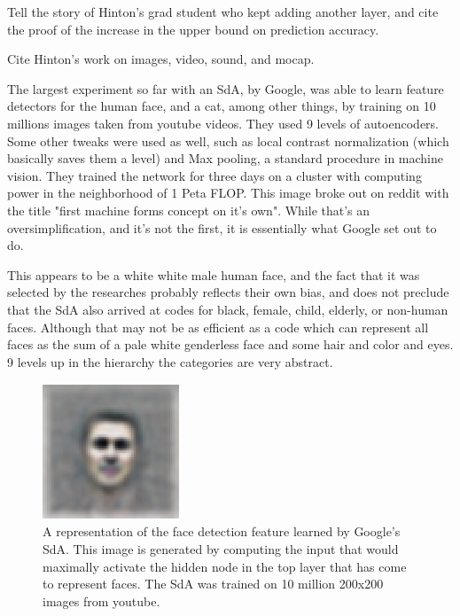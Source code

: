 \documentclass[11pt]{article}
\begin{document}
Tell the story of Hinton's grad student who kept adding another layer, and cite the proof of the increase in the upper bound on prediction accuracy.

Cite Hinton's work on images, video, sound, and mocap.

The largest experiment so far with an SdA, by Google, was able to learn feature detectors for the human face, and a cat, among other things, by training on 10 millions images taken from youtube videos. They used 9 levels of autoencoders. Some other tweaks were used as well, such as local contrast normalization (which basically saves them a level) and Max pooling, a standard procedure in machine vision. They trained the network for three days on a cluster with computing power in the neighborhood of 1 Peta FLOP. This image broke out on reddit with the title "first machine forms concept on it's own". While that's an oversimplification, and it's not the first, it is essentially what Google set out to do.

This appears to be a white white male human face, and the fact that it was selected by the researches probably reflects their own bias, and does not preclude that the SdA also arrived at codes for black, female, child, elderly, or non-human faces. Although that may not be as efficient as a code which can represent all faces as the sum of a pale white genderless face and some hair and color and eyes. 9 levels up in the hierarchy the categories are very abstract. 

\begin{figure}[htb]
\begin{center}
\includegraphics[height=1.6in,width=1.6in]{gman}
\caption{A representation of the face detection feature learned by Google's SdA. This image is generated by computing the input that would maximally activate the hidden node in the top layer that has come to represent faces. The SdA was trained on 10 million 200x200 images from youtube.}
\end{center}
\end{figure}
\end{document}
